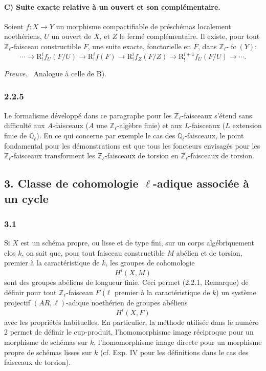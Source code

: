 \documentclass[11pt]{article}
\newenvironment{prooftext}[1][Proof]{\par\noindent\emph{#1.}\ }{\par\medskip}
\newcommand{\R}{\mathrm{R}}\newcommand{\RHomCore}{\mathrm{RHom}}
\providecommand{\fc}{\operatorname{fc}}
\providecommand{\R}{\mathrm R}
\begin{document}
\paragraph{C) Suite exacte relative à un ouvert et son complémentaire.}
Soient \(f:X\to Y\) un morphisme compactifiable de préschémas localement noethériens, \(U\) un ouvert de \(X\), et \(Z\) le fermé complémentaire. Il existe, pour tout \(\mathbb Z_\ell\)-faisceau constructible \(F\), une suite exacte, fonctorielle en \(F\), dans \(\mathbb Z_\ell\text{-}\fc(Y)\):
\[
\cdots\longrightarrow \R^i_!f_U(F/U)
\longrightarrow \R^i_!f(F)
\longrightarrow \R^i_!f_Z(F/Z)
\longrightarrow \R^{i+1}_!f_U(F/U)
\longrightarrow\cdots .
\]

\begin{prooftext}[Preuve]
Analogue à celle de B).
\end{prooftext}

\subsubsection*{2.2.5}
Le formalisme développé dans ce paragraphe pour les \(\mathbb Z_\ell\)-faisceaux s'étend sans difficulté aux \(A\)-faisceaux (\(A\) une \(\mathbb Z_\ell\)-algèbre finie) et aux \(L\)-faisceaux (\(L\) extension finie de \(\mathbb Q_\ell\)). En ce qui concerne par exemple le cas des \(\mathbb Q_\ell\)-faisceaux, le point fondamental pour les démonstrations est que tous les foncteurs envisagés pour les \(\mathbb Z_\ell\)-faisceaux transforment les \(\mathbb Z_\ell\)-faisceaux de torsion en \(\mathbb Z_\ell\)-faisceaux de torsion.

\subsection*{3. Classe de cohomologie \(\ell\)-adique associée à un cycle}

\subsubsection*{3.1}
Si \(X\) est un schéma propre, ou lisse et de type fini, sur un corps algébriquement clos \(k\), on sait que, pour tout faisceau constructible \(M\) abélien et de torsion, premier à la caractéristique de \(k\), les groupes de cohomologie
\[
H^i(X,M)
\]
sont des groupes abéliens de longueur finie. Ceci permet (2.2.1, Remarque) de définir pour tout \(\mathbb Z_\ell\)-faisceau \(F\) (\(\ell\) premier à la caractéristique de \(k\)) un système projectif \((AR,\ell)\)-adique noethérien de groupes abéliens
\[
H^i(X,F)
\]
avec les propriétés habituelles. En particulier, la méthode utilisée dans le numéro 2 permet de définir le cup-produit, l'homomorphisme image réciproque pour un morphisme de schémas sur \(k\), l'homomorphisme image directe pour un morphisme propre de schémas lisses sur \(k\) (cf. Exp. IV pour les définitions dans le cas des faisceaux de torsion).
\end{document}
